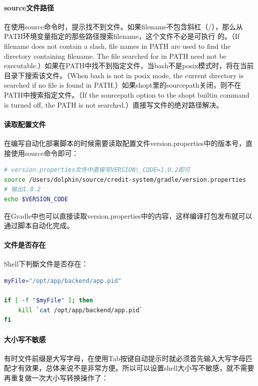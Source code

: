 \documentclass[letter]{book}
\begin{document}
\paragraph{source文件路径}在使用source命令时，提示找不到文件。如果filename不包含斜杠（/），那么从PATH环境变量指定的那些路径搜索filename，这个文件不必是可执行 的。（If filename does not contain a slash, file names in  PATH  are used  to  find the directory containing filename.  The file searched for in PATH need not be executable.）如果在PATH中找不到指定文件，当bash不是posix模式时，将在当前目录下搜索该文件。（When bash is not in posix mode, the current directory is searched if no file is found in PATH.）如果shopt里的sourcepath关闭，则不在PATH中搜索指定文件。（If  the sourcepath  option  to  the shopt builtin command is turned off, the PATH is not searched.）直接写文件的绝对路径解决。

\paragraph{读取配置文件}在编写自动化部署脚本的时候需要读取配置文件version.properties中的版本号，直接使用source命令即可：

\begin{lstlisting}[language=Bash]
# version.properties文件中直接写VERSION\_CODE=1.0.2即可
source /Users/dolphin/source/credit-system/gradle/version.properties
# 输出1.0.2
echo $VERSION_CODE
\end{lstlisting}

在Gradle中也可以直接读取version.properties中的内容，这样编译打包发布就可以通过脚本自动化完成。

\paragraph{文件是否存在}

Shell下判斷文件是否存在：

\begin{lstlisting}[language=Bash]
myFile="/opt/app/backend/app.pid"

if [ -f "$myFile" ]; then
	kill `cat /opt/app/backend/app.pid`
fi
\end{lstlisting}

\paragraph{大小写不敏感}

有时文件前缀是大写字母，在使用Tab按键自动提示时就必须首先输入大写字母匹配才有效果，总体来说不是非常方便。所以可以设置shell大小写不敏感，就不需要再重复做一次大小写转换操作了：
\end{document}
